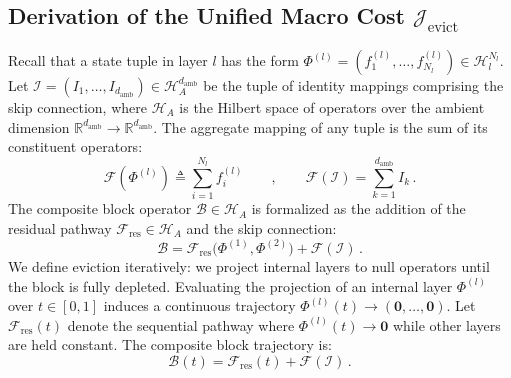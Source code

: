\documentclass[11pt, a4paper, copyright, gdm]{google}
\newcommand{\zeroVect}{\boldsymbol{0}}
\newcommand{\calB}{\mathcal{B}}
\newcommand{\calF}{\mathcal{F}}
\newcommand{\calH}{\mathcal{H}}
\newcommand{\calI}{\mathcal{I}}
\newcommand{\calJ}{\mathcal{J}}
\theoremstyle{definition}
\begin{document}
\subsection{Derivation of the Unified Macro Cost $\calJ_{\text{evict}}$}
\label{sec:app_macro_derivation_unified}
Recall that a state tuple in layer $l$ has the form $\Phi^{(l)} = (f_1^{(l)}, \dots, f_{N_l}^{(l)}) \in \calH_l^{N_l}$. Let $\calI = (I_1, \dots, I_{d_{\text{amb}}}) \in \calH_A^{d_{\text{amb}}}$ be the tuple of identity mappings comprising the skip connection, where $\calH_A$ is the Hilbert space of operators over the ambient dimension $\mathbb{R}^{d_{\text{amb}}} \to \mathbb{R}^{d_{\text{amb}}}$. The aggregate mapping of any tuple is the sum of its constituent operators:
\begin{equation}
\calF(\Phi^{(l)}) \triangleq \sum_{i=1}^{N_l} f_i^{(l)} \qquad,\qquad \calF(\calI) = \sum_{k=1}^{d_{\text{amb}}} I_k \,.
\end{equation}
The composite block operator $\calB \in \calH_A$ is formalized as the addition of the residual pathway $\calF_{\text{res}} \in \calH_A$ and the skip connection:
\begin{equation}
    \calB = \calF_{\text{res}}\big( \Phi^{(1)}, \Phi^{(2)} \big) + \calF(\calI) \,.
\end{equation}
We define eviction iteratively: we project internal layers to null operators until the block is fully depleted. Evaluating the projection of an internal layer $\Phi^{(l)}$ over $t \in [0,1]$ induces a continuous trajectory $\Phi^{(l)}(t) \to (\zeroVect, \dots, \zeroVect)$. Let $\calF_{\text{res}}(t)$ denote the sequential pathway where $\Phi^{(l)}(t) \to \zeroVect$ while other layers are held constant. The composite block trajectory is:
\begin{equation}
\calB(t) = \calF_{\text{res}}(t) + \calF(\calI) \,.
\end{equation}
\end{document}
